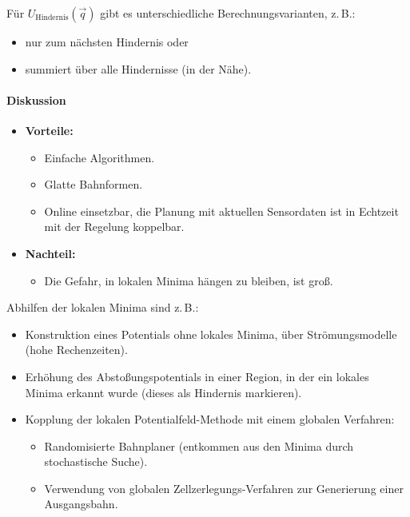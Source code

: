 				Für \( U_\text{Hindernis}(\vec{q}) \) gibt es unterschiedliche Berechnungsvarianten, z.\,B.:
				\begin{itemize}
					\item nur zum nächsten Hindernis oder
					\item summiert über alle Hindernisse (in der Nähe).
				\end{itemize}

			\paragraph{Diskussion}
				\begin{itemize}
					\item \textbf{Vorteile:}
						\begin{itemize}
							\item Einfache Algorithmen.
							\item Glatte Bahnformen.
							\item Online einsetzbar, \dh die Planung mit aktuellen Sensordaten ist in Echtzeit mit der Regelung koppelbar.
						\end{itemize}
					\item \textbf{Nachteil:}
						\begin{itemize}
							\item Die Gefahr, in lokalen Minima hängen zu bleiben, ist groß.
						\end{itemize}
				\end{itemize}

				Abhilfen \bzgl der lokalen Minima sind z.\,B.:
				\begin{itemize}
					\item Konstruktion eines Potentials ohne lokales Minima, \zB über Strömungsmodelle (hohe Rechenzeiten).
					\item Erhöhung des Abstoßungspotentials in einer Region, in der ein lokales Minima erkannt wurde (dieses als Hindernis markieren).
					\item Kopplung der lokalen Potentialfeld-Methode mit einem globalen Verfahren:
						\begin{itemize}
							\item Randomisierte Bahnplaner (entkommen aus den Minima durch stochastische Suche).
							\item Verwendung von globalen Zellzerlegungs-Verfahren zur Generierung einer Ausgangsbahn.
						\end{itemize}
				\end{itemize}

